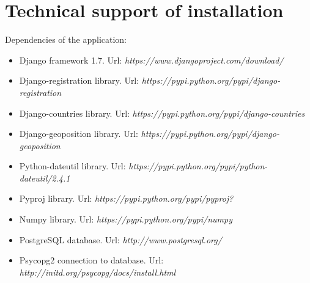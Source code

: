 \chapter{Technical support of installation}\label{apendixc}


Dependencies of the application:
\begin{singlespace}
\begin{itemize}
\item Django framework 1.7. Url: \textit{https://www.djangoproject.com/download/}
\item Django-registration library. Url: \textit{https://pypi.python.org/pypi/django-registration}
\item Django-countries library. Url: \textit{https://pypi.python.org/pypi/django-countries}
\item Django-geoposition library. Url: \textit{https://pypi.python.org/pypi/django-geoposition}
\item Python-dateutil library. Url: \textit{https://pypi.python.org/pypi/python-dateutil/2.4.1}
\item Pyproj library. Url: \textit{https://pypi.python.org/pypi/pyproj?}
\item Numpy library. Url: \textit{https://pypi.python.org/pypi/numpy}
\item PostgreSQL database. Url: \textit{http://www.postgresql.org/}
\item Psycopg2 connection to database. Url: \textit{http://initd.org/psycopg/docs/install.html}
\end{itemize}
\end{singlespace}

